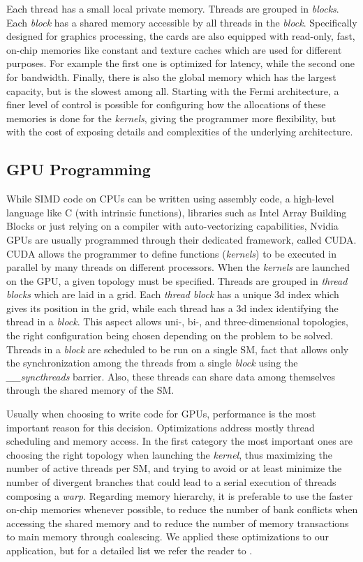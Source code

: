 Each thread has a small local private memory. Threads are grouped in
\textit{blocks}. Each \textit{block} has a shared memory accessible by all
threads in the \textit{block}. Specifically designed for graphics processing,
the cards are also equipped with read-only, fast, on-chip memories like constant
and texture caches which are used for different purposes. For example the first
one is optimized for latency, while the second one for bandwidth. Finally, there
is also the global memory which has the largest capacity, but is the slowest
among all. Starting with the Fermi architecture, a finer level of control is
possible for configuring how the allocations of these memories is done for the
\textit{kernels}, giving the programmer more flexibility, but with the cost of
exposing details and complexities of the underlying architecture.

\subsection{GPU Programming}

While SIMD code on CPUs can be written using assembly code, a high-level
language like C (with intrinsic functions), libraries such as Intel Array
Building Blocks or just relying on a compiler with auto-vectorizing
capabilities, Nvidia GPUs are usually  programmed through their dedicated
framework, called CUDA. CUDA allows the programmer to define functions
(\textit{kernels}) to be executed in parallel by many threads on different
processors. When the \textit{kernels} are launched on the GPU, a given topology
must be specified. Threads are grouped in \textit{thread blocks} which are laid
in a grid. Each \textit{thread block} has a unique 3d index which gives its
position in the grid, while each thread has a 3d index identifying the thread in
a \textit{block}. This aspect allows uni-, bi-, and three-dimensional
topologies, the right configuration being chosen depending on the problem to be
solved. Threads in a \textit{block} are scheduled to be run on a single SM, fact
that allows only the synchronization among the threads from a single
\textit{block} using the \emph{\_\_syncthreads} barrier. Also, these threads can
share data among themselves through the shared memory of the SM.

Usually when choosing to write code for GPUs, performance is the most important
reason for this decision. Optimizations address mostly thread scheduling and
memory access. In the first category the most important ones are choosing the
right topology when launching the \textit{kernel}, thus maximizing the number of
active threads per SM, and trying to avoid or at least minimize the number of
divergent branches that could lead to a serial execution of threads composing a
\textit{warp}. Regarding memory hierarchy, it is preferable to use the faster 
on-chip memories whenever possible, to reduce the number of bank conflicts when
accessing the shared memory and to reduce the number of memory transactions to
main memory through coalescing. We applied these optimizations to our
application, but for a detailed list we refer the reader to \cite{cuda}.
